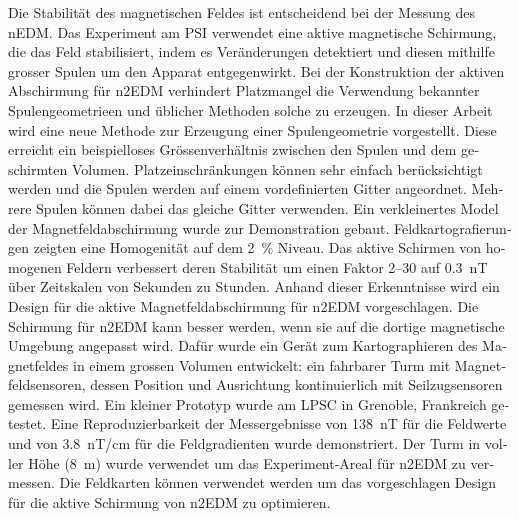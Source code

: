 \begin{otherlanguage}{ngerman}
Die Stabilität des magnetischen Feldes ist entscheidend bei der Messung des nEDM\@.
Das Experiment am PSI verwendet eine aktive magnetische Schirmung, die das Feld stabilisiert, indem es Veränderungen detektiert und diesen mithilfe grosser Spulen um den Apparat entgegenwirkt.
Bei der Konstruktion der aktiven Abschirmung für n2EDM verhindert Platzmangel die Verwendung bekannter Spulengeometrieen und üblicher Methoden solche zu erzeugen.
In dieser Arbeit wird eine neue Methode zur Erzeugung einer Spulengeometrie vorgestellt. Diese erreicht ein beispielloses Grössenverhältnis zwischen den Spulen und dem geschirmten Volumen.
Platzeinschränkungen können sehr einfach berücksichtigt werden und die Spulen werden auf einem vordefinierten Gitter angeordnet. Mehrere Spulen können dabei das gleiche Gitter verwenden.
Ein verkleinertes Model der Magnetfeldabschirmung wurde zur Demonstration gebaut. Feldkartografierungen zeigten eine Homogenität auf dem \SI{2}{\percent} Niveau.
Das aktive Schirmen von homogenen Feldern verbessert deren Stabilität um einen Faktor 2--30 auf \SI{0.3}{nT} über  Zeitskalen von Sekunden zu Stunden.
Anhand dieser Erkenntnisse wird ein Design für die aktive Magnetfeldabschirmung für n2EDM vorgeschlagen.
Die Schirmung für n2EDM kann besser werden, wenn sie auf die dortige magnetische Umgebung angepasst wird.
Dafür wurde ein Gerät zum Kartographieren des Magnetfeldes in einem grossen Volumen entwickelt: ein fahrbarer Turm mit Magnetfeldsensoren, dessen Position und Ausrichtung kontinuierlich mit Seilzugsensoren gemessen wird.
Ein kleiner Prototyp wurde am LPSC in Grenoble, Frankreich getestet. Eine Reproduzierbarkeit der Messergebnisse von \SI{138}{nT} für die Feldwerte und von \SI{3.8}{nT/cm} für die Feldgradienten wurde demonstriert.
Der Turm in voller Höhe  (\SI{8}{m}) wurde verwendet um das Experiment-Areal für n2EDM zu vermessen.
Die Feldkarten können verwendet werden um das vorgeschlagen Design für die aktive Schirmung von n2EDM zu optimieren.



\end{otherlanguage}
